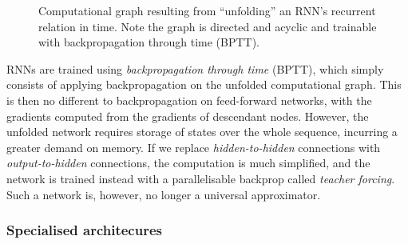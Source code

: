 \documentclass[11pt]{amsart}
\begin{document}
\begin{figure}[h!]
\centering
{}
\caption{Computational graph resulting from ``unfolding'' an RNN's recurrent relation in time. Note the graph is directed and acyclic and trainable with backpropagation through time (BPTT).}
\label{fig:rnn_comp}
\end{figure}

RNNs are trained using \emph{backpropagation through time} (BPTT), which simply consists of applying backpropagation on the unfolded computational graph. This is then no different to backpropagation on feed-forward networks, with the gradients computed from the gradients of descendant nodes. However, the unfolded network requires storage of states over the whole sequence, incurring a greater demand on memory. If we replace \emph{hidden-to-hidden} connections with \emph{output-to-hidden} connections, the computation is much simplified, and the network is trained instead with a parallelisable backprop called \emph{teacher forcing}. Such a network is, however, no longer a universal approximator.

\subsubsection{Specialised architecures}
\end{document}
